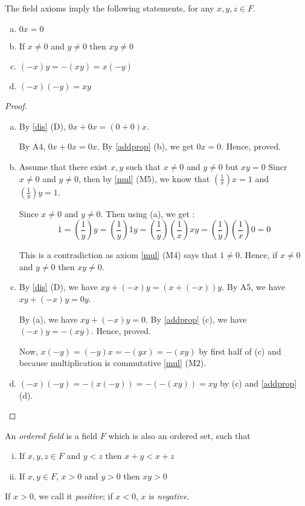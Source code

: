 \begin{prop}
	\label{disprop}
	The field axioms imply the following statements, for any $x, y, z \in F$.
	\begin{enumerate}[a)]
		\item $0x = 0$
		\item If $x \neq 0$ and $y \neq 0$ then $xy \neq 0$
		\item $(-x)y = -(xy) = x(-y)$
		\item $(-x)(-y) = xy$
	\end{enumerate}
\end{prop}

\begin{proof}
	\begin{enumerate}[a)]
		\item By \ref{dis} (D), $0x + 0x = (0 + 0)x$.

		By A4, $0x + 0x = 0x$. By \ref{addprop} (b), we get $0x = 0$. Hence, proved.

		\item Assume that there exist $x, y$ such that $x \neq 0$ and $y \neq 0$ but $xy = 0$
		Sincr $x \neq 0$ and $y \neq 0$, then by \ref{mul} (M5),
		we know that $\left( \frac{1}{x} \right) x = 1$
		and $\left( \frac{1}{y} \right) y = 1$.

		Since $x \neq 0$ and $y \neq 0$. Then using (a), we get :
			$$ 1 = \left( \frac{1}{y} \right) y = \left( \frac{1}{y} \right) 1 y
				= \left( \frac{1}{y} \right) \left( \frac{1}{x} \right) x y
				= \left( \frac{1}{y} \right) \left( \frac{1}{x} \right) 0
				= 0
			$$

		This is a contradiction as axiom \ref{mul} (M4) says that $1 \neq 0$.
		Hence, if $x \neq 0$ and $y \neq 0$ then $xy \neq 0$.

		\item By \ref{dis} (D), we have $xy + (-x)y = (x+(-x))y$.
		By A5, we have $xy + (-x)y = 0y$.

		By (a), we have $xy + (-x)y = 0$.
		By \ref{addprop} (c), we have $(-x)y = -(xy)$. Hence, proved.

		Now, $x(-y) = (-y)x = -(yx) = -(xy)$ by first half of (c)
		and because multiplication is commutative \ref{mul} (M2).

		\item $(-x)(-y) = -(x(-y)) = -(-(xy)) = xy$ by (c) and \ref{addprop} (d).
	\end{enumerate}
\end{proof}


\begin{defn}
	\label{ordf}
	An {\it ordered field} is a field $F$ which is also an ordered set, such that
	\begin{enumerate}[(i)]
		\item If $x, y, z \in F$ and $y < z$ then $x + y < x + z$
		\item If $x, y \in F$, $x > 0$ and $y > 0$ then $xy > 0$
	\end{enumerate}
	If $x > 0$, we call it {\it positive}; if $x < 0$, $x$ is {\it negative}.
\end{defn}

